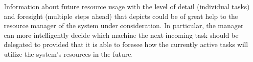Information about future resource usage with the level of detail (individual
tasks) and foresight (multiple steps ahead) that 
depicts could be of great help to the resource manager of the system under
consideration. In particular, the manager can more intelligently decide which
machine the next incoming task should be delegated to provided that it is able
to foresee how the currently active tasks will utilize the system's resources in
the future.
